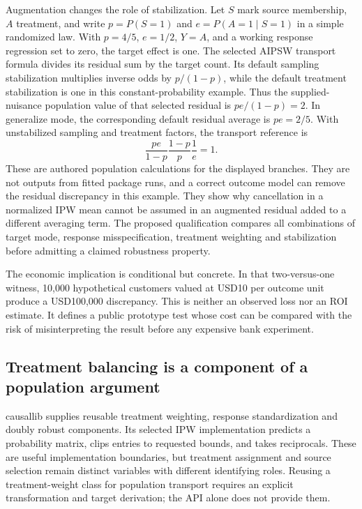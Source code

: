 Augmentation changes the role of stabilization. Let $S$ mark source membership, $A$ treatment, and write $p=P(S=1)$ and $e=P(A=1\mid S=1)$ in a simple randomized law. With $p=4/5$, $e=1/2$, $Y=A$, and a working response regression set to zero, the target effect is one. The selected AIPSW transport formula divides its residual sum by the target count. Its default sampling stabilization multiplies inverse odds by $p/(1-p)$, while the default treatment stabilization is one in this constant-probability example. Thus the supplied-nuisance population value of that selected residual is $pe/(1-p)=2$. In generalize mode, the corresponding default residual average is $pe=2/5$. With unstabilized sampling and treatment factors, the transport reference is
\[
 \frac{pe}{1-p}\frac{1-p}{p}\frac1e=1.
\]
These are authored population calculations for the displayed branches. They are not outputs from fitted package runs, and a correct outcome model can remove the residual discrepancy in this example. They show why cancellation in a normalized IPW mean cannot be assumed in an augmented residual added to a different averaging term. The proposed qualification compares all combinations of target mode, response misspecification, treatment weighting and stabilization before admitting a claimed robustness property.~\citep{exec25_ptm_zepid,exec25_ptm_choice}

The economic implication is conditional but concrete. In that two-versus-one witness, 10,000 hypothetical customers valued at USD10 per outcome unit produce a USD100,000 discrepancy. This is neither an observed loss nor an ROI estimate. It defines a public prototype test whose cost can be compared with the risk of misinterpreting the result before any expensive bank experiment.~\citep{exec25_ptm_choice}

\subsection{Treatment balancing is a component of a population argument}

causallib supplies reusable treatment weighting, response standardization and doubly robust components. Its selected IPW implementation predicts a probability matrix, clips entries to requested bounds, and takes reciprocals. These are useful implementation boundaries, but treatment assignment and source selection remain distinct variables with different identifying roles. Reusing a treatment-weight class for population transport requires an explicit transformation and target derivation; the API alone does not provide them.~\citep{exec25_ptm_causallib}

